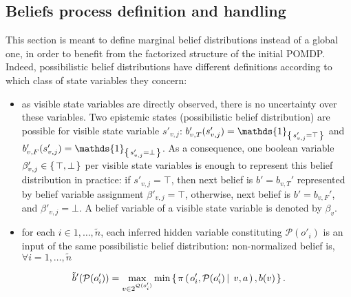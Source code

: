 
\subsection{Beliefs process definition and handling}
This section is meant to define marginal belief distributions instead of a global one,
in order to benefit from the factorized structure of the initial POMDP. Indeed,
possibilistic belief distributions have different definitions according to which class of state variables they concern:
\begin{itemize}
\item as visible state variables are directly observed, there is no uncertainty over
 these variables. Two epistemic states (possibilistic belief distribution) 
are possible for visible state variable 
$s'_{v,j}$: 
$b_{v,T}'(s'_{v,j}) = \mathds{1}_{ \set{s'_{v,j}=\top}}$ and 
$b_{v,F}'(s'_{v,j}) = \mathds{1}_{\set{s'_{v,j}=\bot}}$. As a consequence, one boolean variable 
$\beta_{v,j}' \in \left\{ \left.  \top, \bot  \right. \right\}$ per visible state variables is enough to represent this 
belief distribution in practice: if $s'_{v,j}=\top$, then next belief is $b'=b_{v,T}'$ represented 
by belief variable assignment $\beta'_{v,j} = \top$, otherwise, next belief is $b'=b_{v,F}'$, and $\beta'_{v,j} = \bot$.
A belief variable of a visible state variable is denoted by $\beta_v$.
\item for each $i \in 1,\ldots,\tilde{n}$, each inferred hidden variable constituting 
$\mathcal{P}(o'_i)$ is an input of the same possibilistic belief distribution: 
non-normalized belief is, $\forall i=1,\ldots,\tilde{n}$
\end{itemize}
\begin{equation}
\label{inferredBel}
\tilde{b}'(\mathcal{P}(o_i')) = \max_{v \in 2^{\mathcal{Q}(o_i')}} \min \left\{ \left.  \pi \left( \left.  o_i', \mathcal{P}(o_i') \, \right| \left. \, v,a \right. \right), b(v)  \right. \right\}.
\end{equation}
